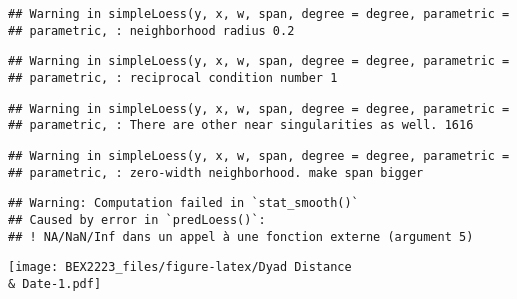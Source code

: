\documentclass[
]{article}
\begin{document}
\begin{verbatim}
## Warning in simpleLoess(y, x, w, span, degree = degree, parametric =
## parametric, : neighborhood radius 0.2
\end{verbatim}

\begin{verbatim}
## Warning in simpleLoess(y, x, w, span, degree = degree, parametric =
## parametric, : reciprocal condition number 1
\end{verbatim}

\begin{verbatim}
## Warning in simpleLoess(y, x, w, span, degree = degree, parametric =
## parametric, : There are other near singularities as well. 1616
\end{verbatim}

\begin{verbatim}
## Warning in simpleLoess(y, x, w, span, degree = degree, parametric =
## parametric, : zero-width neighborhood. make span bigger
\end{verbatim}

\begin{verbatim}
## Warning: Computation failed in `stat_smooth()`
## Caused by error in `predLoess()`:
## ! NA/NaN/Inf dans un appel à une fonction externe (argument 5)
\end{verbatim}

\texttt{[image: BEX2223\_files/figure-latex/Dyad Distance \\\& Date-1.pdf]}
\end{document}
